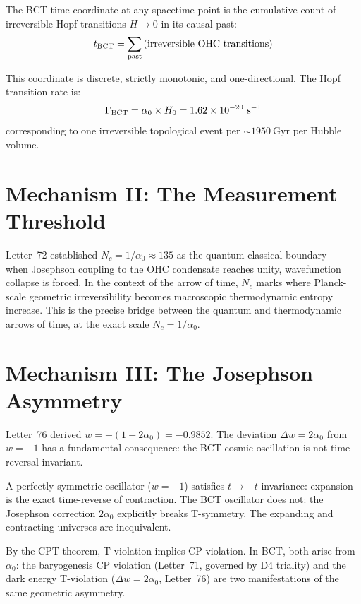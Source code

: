 \documentclass[aps,prl,twocolumn,showpacs,superscriptaddress]{revtex4-2}
\begin{document}
\begin{definition}
The BCT time coordinate at any spacetime point is the cumulative count of 
irreversible Hopf transitions $H\to 0$ in its causal past:
\begin{equation}
    t_{\rm BCT} = \sum_{\rm past} \text{(irreversible OHC transitions)}
\end{equation}
\end{definition}

This coordinate is discrete, strictly monotonic, and one-directional. 
The Hopf transition rate is:
\begin{equation}
    \Gamma_{\rm BCT} = \alpha_0 \times H_0 = 1.62 \times 10^{-20}~\text{s}^{-1}
\end{equation}
corresponding to one irreversible topological event per $\sim 1950~\text{Gyr}$ 
per Hubble volume.

\section{Mechanism II: The Measurement Threshold}

Letter~72 established $N_c = 1/\alpha_0 \approx 135$ as the quantum-classical 
boundary --- when Josephson coupling to the OHC condensate reaches unity, 
wavefunction collapse is forced. In the context of the arrow of time, $N_c$ 
marks where Planck-scale geometric irreversibility becomes macroscopic 
thermodynamic entropy increase. This is the precise bridge between the quantum 
and thermodynamic arrows of time, at the exact scale $N_c = 1/\alpha_0$.

\section{Mechanism III: The Josephson Asymmetry}

Letter~76 derived $w = -(1-2\alpha_0) = -0.9852$. The deviation $\Delta w = 2\alpha_0$ 
from $w = -1$ has a fundamental consequence: the BCT cosmic oscillation is not 
time-reversal invariant.

A perfectly symmetric oscillator ($w = -1$) satisfies $t \to -t$ invariance: 
expansion is the exact time-reverse of contraction. The BCT oscillator does not: 
the Josephson correction $2\alpha_0$ explicitly breaks T-symmetry. The expanding 
and contracting universes are inequivalent.

By the CPT theorem, T-violation implies CP violation. In BCT, both arise from 
$\alpha_0$: the baryogenesis CP violation (Letter~71, governed by D4 triality) 
and the dark energy T-violation ($\Delta w = 2\alpha_0$, Letter~76) are two 
manifestations of the same geometric asymmetry.
\end{document}
